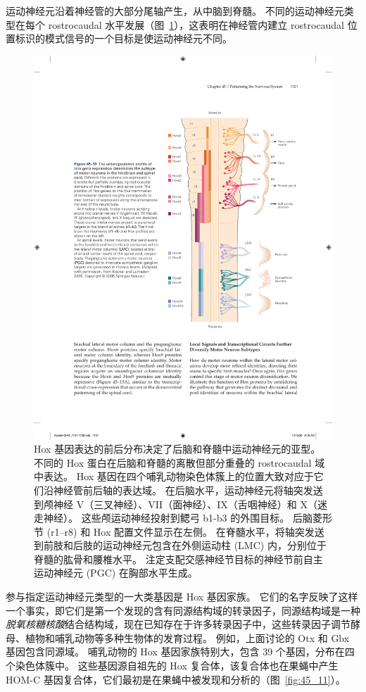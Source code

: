 运动神经元沿着神经管的大部分尾轴产生，从中脑到脊髓。
不同的运动神经元类型在每个 rostrocaudal 水平发展（图~\ref{fig:45_10}），这表明在神经管内建立 rostrocaudal 位置标识的模式信号的一个目标是使运动神经元不同。


\begin{figure}[htbp]
	\centering
	\includegraphics[width=0.65\linewidth]{chap45/fig_45_10}
	\caption{Hox 基因表达的前后分布决定了后脑和脊髓中运动神经元的亚型。
		不同的 Hox 蛋白在后脑和脊髓的离散但部分重叠的 rostrocaudal 域中表达。
		Hox 基因在四个哺乳动物染色体簇上的位置大致对应于它们沿神经管前后轴的表达域。
		在后脑水平，运动神经元将轴突发送到颅神经 V（三叉神经）、VII（面神经）、IX（舌咽神经）和 X（迷走神经）。
		这些颅运动神经投射到鳃弓 b1-b3 的外围目标。
		后脑菱形节 (r1–r8) 和 Hox 配置文件显示在左侧。
		在脊髓水平，将轴突发送到前肢和后肢的运动神经元包含在外侧运动柱 (LMC) 内，分别位于脊髓的肱骨和腰椎水平。
		注定支配交感神经节目标的神经节前自主运动神经元 (PGC) 在胸部水平生成\cite{kiecker2005compartments}。 }
	\label{fig:45_10}
\end{figure}


参与指定运动神经元类型的一大类基因是 Hox 基因家族。
它们的名字反映了这样一个事实，即它们是第一个发现的含有同源结构域的转录因子，同源结构域是一种\textit{脱氧核糖核酸}结合结构域，现在已知存在于许多转录因子中，这些转录因子调节酵母、植物和哺乳动物等多种生物体的发育过程。
例如，上面讨论的 Otx 和 Gbx 基因包含同源域。
哺乳动物的 Hox 基因家族特别大，包含 39 个基因，分布在四个染色体簇中。
这些基因源自祖先的 Hox 复合体，该复合体也在果蝇中产生 HOM-C 基因复合体，它们最初是在果蝇中被发现和分析的（图~\ref{fig:45_11}）。


